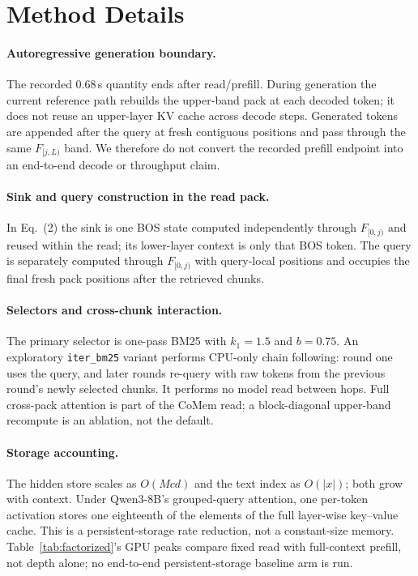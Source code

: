 \section{Method Details}
\label{app:method-details}

\paragraph{Autoregressive generation boundary.}
The recorded 0.68\,s quantity ends after read/prefill.  During generation the
current reference path rebuilds the upper-band pack at each decoded token; it
does not reuse an upper-layer KV cache across decode steps.  Generated tokens
are appended after the query at fresh contiguous positions and pass through
the same $F_{[j,L)}$ band.  We therefore do not convert the recorded prefill
endpoint into an end-to-end decode or throughput claim.

\paragraph{Sink and query construction in the read pack.}
In Eq.~(2) the sink is one BOS state computed independently through $F_{[0,j)}$
and reused within the read; its lower-layer context is only that BOS token.  The
query is separately computed through $F_{[0,j)}$ with query-local positions and
occupies the final fresh pack positions after the retrieved chunks.

\paragraph{Selectors and cross-chunk interaction.}
The primary selector is one-pass BM25 with $k_1=1.5$ and $b=0.75$.  An
exploratory \texttt{iter\_bm25} variant performs CPU-only chain following:
round one uses the query, and later rounds re-query with raw tokens from the
previous round's newly selected chunks.  It performs no model read between
hops.  Full cross-pack attention is part of the CoMem read; a block-diagonal
upper-band recompute is an ablation, not the default.

\paragraph{Storage accounting.}
The hidden store scales as $O(Mcd)$ and the text index as $O(|x|)$; both grow
with context.  Under Qwen3-8B's grouped-query attention, one per-token
activation stores one eighteenth of the elements of the full layer-wise
key--value cache.  This is a persistent-storage rate reduction, not a
constant-size memory.  Table~\ref{tab:factorized}'s GPU peaks compare fixed
read with full-context prefill, not depth alone; no end-to-end
persistent-storage baseline arm is run.

